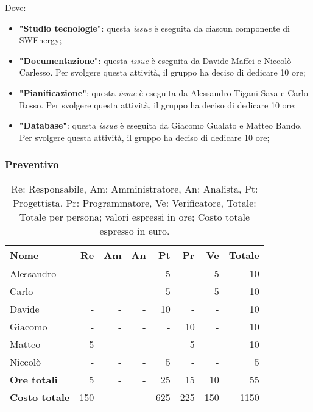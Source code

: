 Dove:
\begin{itemize}
	\item \textbf{"Studio tecnologie"}: questa \textit{issue} è eseguita da
	      ciascun componente di SWEnergy;

	\item \textbf{"Documentazione"}: questa \textit{issue} è eseguita da
	      Davide Maffei e Niccolò Carlesso. Per svolgere questa attività, il
	      gruppo ha deciso di dedicare 10 ore;

	\item \textbf{"Pianificazione"}: questa \textit{issue} è eseguita da
	      Alessandro Tigani Sava e Carlo Rosso. Per svolgere questa attività,
	      il gruppo ha deciso di dedicare 10 ore;

	\item \textbf{"Database"}: questa \textit{issue} è eseguita da
	      Giacomo Gualato e Matteo Bando. Per svolgere questa attività, il
	      gruppo ha deciso di dedicare 10 ore;
\end{itemize}

\subsubsection{Preventivo}

\begin{table}[H]
	\centering
	\begin{tabular}{l|r|r|r|r|r|r|r}
		\textbf{Nome}         & \textbf{Re} & \textbf{Am} & \textbf{An} & \textbf{Pt} & \textbf{Pr} & \textbf{Ve} & \textbf{Totale} \\
		\hline
		Alessandro            & -           & -           & -           & 5           & -           & 5           & 10              \\
		Carlo                 & -           & -           & -           & 5           & -           & 5           & 10              \\
		Davide                & -           & -           & -           & 10          & -           & -           & 10              \\
		Giacomo               & -           & -           & -           & -           & 10           & -           & 10               \\
		Matteo                & 5           & -           & -           & -           & 5           & -           & 10              \\
		Niccolò               & -           & -           & -           & 5           & -           & -           & 5               \\
		\hline
		\textbf{Ore totali}   & 5           & -           & -           & 25          & 15          & 10          & 55              \\
		\textbf{Costo totale} & 150         & -           & -           & 625         & 225         & 150         & 1150
	\end{tabular}
	\caption{Re: Responsabile, Am: Amministratore, An: Analista, Pt: Progettista,
		Pr: Programmatore, Ve: Verificatore, Totale: Totale per persona; valori espressi in ore; Costo totale espresso in euro.}
\end{table}

